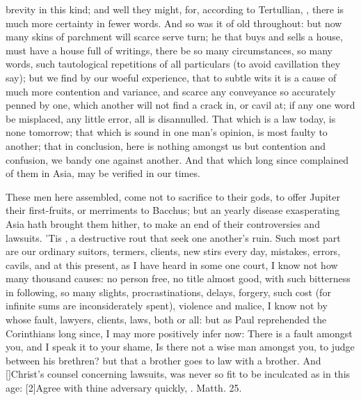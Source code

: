 brevity in this kind; and well they might, for, according to
Tertullian, , there is much more certainty in
fewer words. And so was it of old throughout: but now many skins of
parchment will scarce serve turn; he that buys and sells a house, must
have a house full of writings, there be so many circumstances, so many
words, such tautological repetitions of all particulars (to avoid
cavillation they say); but we find by our woeful experience, that to
subtle wits it is a cause of much more contention and variance, and
scarce any conveyance so accurately penned by one, which another will
not find a crack in, or cavil at; if any one word be misplaced, any
little error, all is disannulled. That which is a law today, is none
tomorrow; that which is sound in one man's opinion, is most faulty to
another; that in conclusion, here is nothing amongst us but contention
and confusion, we bandy one against another. And that which long since
 complained of them in Asia, may be verified in our times.

These men here assembled, come not to sacrifice to their gods, to offer
Jupiter their first-fruits, or merriments to Bacchus; but an yearly
disease exasperating Asia hath brought them hither, to make an end of
their controversies and lawsuits. 'Tis , a destructive rout that seek one another's ruin. Such most
part are our ordinary suitors, termers, clients, new stirs every day,
mistakes, errors, cavils, and at this present, as I have heard in some
one court, I know not how many thousand causes: no person free, no
title almost good, with such bitterness in following, so many slights,
procrastinations, delays, forgery, such cost (for infinite sums are
inconsiderately spent), violence and malice, I know not by whose fault,
lawyers, clients, laws, both or all: but as Paul reprehended the
Corinthians long since, I may more positively infer now: There is
a fault amongst you, and I speak it to your shame, Is there not a
wise man amongst you, to judge between his brethren? but that a
brother goes to law with a brother. And [\baselineskip]Christ's counsel
concerning lawsuits, was never so fit to be inculcated as in this age:
[2\baselineskip]Agree with thine adversary quickly, \etc{}. Matth.  25.

